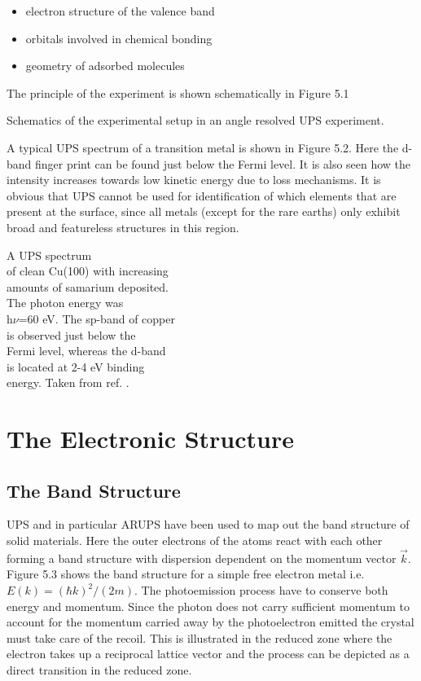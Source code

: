 \begin{itemize}
\item electron structure of the valence band
\item orbitals involved in chemical bonding
\item geometry of adsorbed molecules
\end{itemize}

The principle of the experiment is shown schematically in Figure 5.1

\vspace*{11cm}

           Schematics of the experimental setup in an angle resolved UPS experiment.
 
\vspace{1cm}

A typical UPS spectrum of a transition metal is shown in Figure 5.2. Here the d-band finger print can be found just below the Fermi level. It is also seen how the intensity increases towards low kinetic energy due to loss mechanisms. It is obvious that UPS cannot be used for identification of which elements that are present at the surface, since all metals (except for the rare earths) only exhibit broad and featureless structures in this region. 

\vspace*{8cm}

           A UPS spectrum\\ of clean  Cu(100) with increasing\\ amounts of samarium deposited.\\ The photon energy was\\ h$\nu$=60 eV. The  sp-band of copper\\  is observed just  below the\\ Fermi level, whereas the  d-band\\ is located at 2-4 eV binding\\ energy. Taken from ref. \cite{Andersen}.
 
\vspace{1cm}

\section{The Electronic Structure}
\subsection{The Band Structure}
UPS and in particular ARUPS have been used to map out the band structure of solid materials. Here the outer electrons of the atoms react with each other forming a band structure with dispersion dependent on the momentum vector $\vec{k}$. Figure 5.3 shows the band structure for a simple free electron metal i.e. $E(k)=(\hbar k)^2/(2m)$. The photoemission process have to conserve both energy and momentum. Since the photon does not carry sufficient momentum to account for the momentum carried away by the photoelectron emitted the crystal must take care of the recoil. This is illustrated in the reduced zone where the electron takes up a reciprocal lattice vector and the process can be depicted as a direct transition in the reduced zone.

